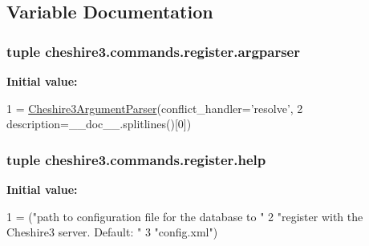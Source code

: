 \subsection{Variable Documentation}
\hypertarget{namespacecheshire3_1_1commands_1_1register_aaf1030e2e59995cf7cf72f74c85a3ef6}{
\subsubsection[{argparser}]{\setlength{\rightskip}{0pt plus 5cm}tuple cheshire3.\-commands.\-register.\-argparser}}\label{namespacecheshire3_1_1commands_1_1register_aaf1030e2e59995cf7cf72f74c85a3ef6}
{\bfseries Initial value\-:}
\begin{DoxyCode}
1 = \hyperlink{classcheshire3_1_1commands_1_1cmd__utils_1_1_cheshire3_argument_parser}{Cheshire3ArgumentParser}(conflict\_handler=\textcolor{stringliteral}{'resolve'},
2                                     description=\_\_doc\_\_.splitlines()[0])
\end{DoxyCode}
\hypertarget{namespacecheshire3_1_1commands_1_1register_a1310b299c530dd5e9c9f5fdfebe0409c}{
\subsubsection[{help}]{\setlength{\rightskip}{0pt plus 5cm}tuple cheshire3.\-commands.\-register.\-help}}\label{namespacecheshire3_1_1commands_1_1register_a1310b299c530dd5e9c9f5fdfebe0409c}
{\bfseries Initial value\-:}
\begin{DoxyCode}
1 = (\textcolor{stringliteral}{"path to configuration file for the database to "}
2                              \textcolor{stringliteral}{"register with the Cheshire3 server. Default: "}
3                              \textcolor{stringliteral}{"config.xml"})
\end{DoxyCode}
